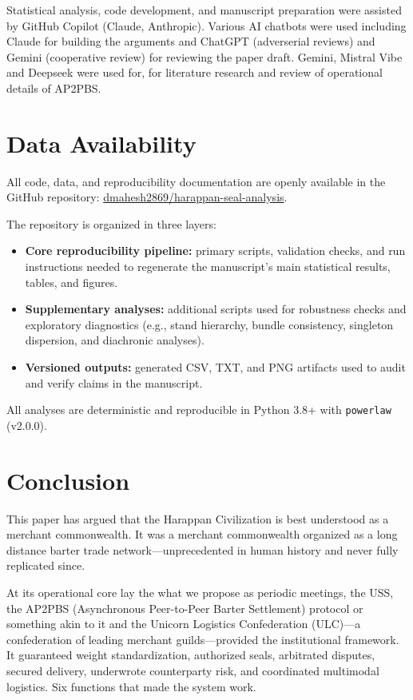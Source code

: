 \documentclass[12pt]{article}
\begin{document}
Statistical analysis, code development, and manuscript preparation were assisted by
GitHub Copilot (Claude, Anthropic). Various AI chatbots were used including
Claude for building the arguments and ChatGPT (adverserial reviews) and Gemini
(cooperative review) for reviewing the paper draft. Gemini, Mistral Vibe and
Deepseek were used for, for literature research and review of operational details
of AP2PBS.

\section*{Data Availability}

All code, data, and reproducibility documentation are openly available in the
GitHub repository:
\href{https://github.com/dmahesh2869/harappan-seal-analysis}{dmahesh2869/harappan-seal-analysis}.

The repository is organized in three layers:
\begin{itemize}
        \item \textbf{Core reproducibility pipeline:} primary scripts, validation checks,
        and run instructions needed to regenerate the manuscript's main statistical
        results, tables, and figures.
        \item \textbf{Supplementary analyses:} additional scripts used for robustness
        checks and exploratory diagnostics (e.g., stand hierarchy, bundle consistency,
        singleton dispersion, and diachronic analyses).
        \item \textbf{Versioned outputs:} generated CSV, TXT, and PNG artifacts used to
        audit and verify claims in the manuscript.
\end{itemize}

All analyses are deterministic and reproducible in Python 3.8+ with
\texttt{powerlaw} (v2.0.0).

\section{Conclusion}

This paper has argued that the Harappan Civilization is best understood as a merchant
commonwealth. It was a merchant commonwealth organized as a long distance barter trade
network---unprecedented in human history and never fully replicated since.

At its operational core lay the what we propose as periodic meetings, the USS,
the AP2PBS (Asynchronous Peer-to-Peer Barter Settlement) protocol or something akin
to it and the Unicorn Logistics Confederation (ULC)---a confederation of leading merchant
guilds---provided the institutional framework. It guaranteed weight standardization,
authorized seals, arbitrated disputes, secured delivery, underwrote counterparty
risk, and coordinated multimodal logistics. Six functions that made the system work.
\end{document}
